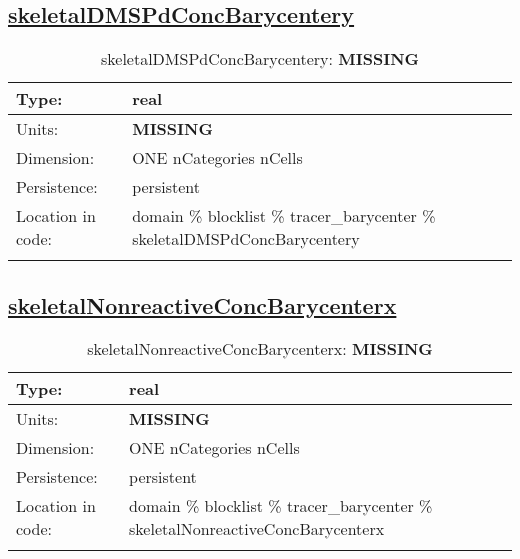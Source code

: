 \subsection[skeletalDMSPdConcBarycentery]{\hyperref[sec:var_tab_tracer_barycenter]{skeletalDMSPdConcBarycentery}}
\label{subsec:var_sec_tracer_barycenter_skeletalDMSPdConcBarycentery}
\begin{center}
\begin{longtable}{| p{2.0in} | p{4.0in} |}
        \hline 
        Type: & real \\
        \hline 
        Units: & {\bf \color{red} MISSING} \\
        \hline 
        Dimension: & ONE nCategories nCells \\
        \hline 
        Persistence: & persistent \\
        \hline 
         Location in code: & domain \% blocklist \% tracer\_barycenter \% skeletalDMSPdConcBarycentery \\
         \hline 
    \caption{skeletalDMSPdConcBarycentery: {\bf \color{red} MISSING}}
\end{longtable}
\end{center}
\subsection[skeletalNonreactiveConcBarycenterx]{\hyperref[sec:var_tab_tracer_barycenter]{skeletalNonreactiveConcBarycenterx}}
\label{subsec:var_sec_tracer_barycenter_skeletalNonreactiveConcBarycenterx}
\begin{center}
\begin{longtable}{| p{2.0in} | p{4.0in} |}
        \hline 
        Type: & real \\
        \hline 
        Units: & {\bf \color{red} MISSING} \\
        \hline 
        Dimension: & ONE nCategories nCells \\
        \hline 
        Persistence: & persistent \\
        \hline 
         Location in code: & domain \% blocklist \% tracer\_barycenter \% skeletalNonreactiveConcBarycenterx \\
         \hline 
    \caption{skeletalNonreactiveConcBarycenterx: {\bf \color{red} MISSING}}
\end{longtable}
\end{center}
